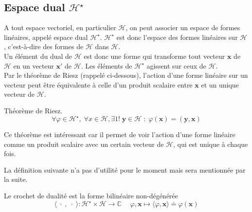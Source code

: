 \documentclass[../notesdecours.tex]{subfiles}
\newcommand{\hcal}{\mathcal{H}}
\newcommand{\hcals}{\mathcal{H} ^\star}
\begin{document}
\subsection{Espace dual $\hcals$}
A tout espace vectoriel, en particulier $\hcal$, on peut associer un espace de formes linéaires, appelé espace dual $\hcals$. $\hcals$ est donc l'espace des formes linéaires sur $\hcal$, c'est-à-dire des formes de $\hcal$ dans $\hcal$. \\

Un élément du dual de $\hcal$ est donc une forme qui transforme tout vecteur $\bm{x}$ de $\hcal$ en un vecteur $\bm{x}'$ de $\hcal$. Les éléments de $\hcals$ agissent sur ceux de $\hcal$.\\

Par le théorème de Riesz (rappelé ci-dessous), l'action d'une forme linéaire sur un vecteur peut être équivalente à celle d'un produit scalaire entre $\bm{x}$ et un unique vecteur de $\hcal$.

\begin{theorem}
    Théorème de Riesz. 
    \begin{equation}
        \forall \varphi \in \hcals , \; \forall x \in \hcal, \exists 1! \; \bm{y} \in \hcal \; : \; \varphi(\bm{x}) = (\bm{y}, \bm{x})
    \end{equation}
\end{theorem}

Ce théorème est intéressant car il permet de voir l'action d'une forme linéaire comme un produit scalaire avec un certain vecteur de $\hcal$, qui est unique à chaque fois.

La définition suivante n'a pas d'utilité pour le moment mais sera mentionnée par la suite.
\begin{definition} \label{def:crochet de dualité}
    Le crochet de dualité est la forme bilinéaire non-dégénérée
    \begin{equation}
        \langle \; \cdot \; , \; \cdot \; \rangle : \hcals \times \hcal \longrightarrow \mathbb{C}\; \quad \varphi, \bm{x} \longmapsto \langle\varphi, \bm{x}\rangle \doteq \varphi(\bm{x})
    \end{equation}
\end{definition}
\end{document}
